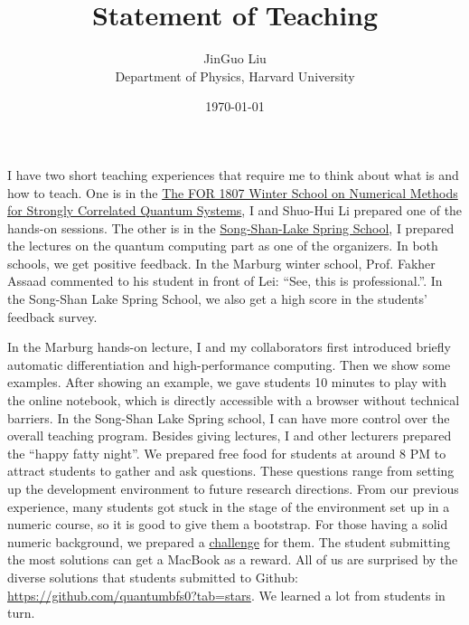 \documentclass[a4paper]{article}
\title{Statement of Teaching}
\author{JinGuo Liu\\ Department of Physics, Harvard University}
\date{\today}
\newcommand{\<}{\langle}
\renewcommand{\>}{\rangle}
\begin{document}
\fontsize{10}{13}
\selectfont
\maketitle

I have two short teaching experiences that require me to think about what is and how to teach.
One is in the \href{https://for1807.physik.uni-wuerzburg.de/2017/07/11/winter-school-2018/}{The FOR 1807 Winter School on Numerical Methods for Strongly Correlated Quantum Systems}, I and Shuo-Hui Li prepared one of the hands-on sessions.
The other is in the \href{https://github.com/QuantumBFS/SSSS}{Song-Shan-Lake Spring School}, I prepared the lectures on the quantum computing part as one of the organizers.
In both schools, we get positive feedback. In the Marburg winter school, Prof. Fakher Assaad commented to his student in front of Lei: ``See, this is professional.''.
In the Song-Shan Lake Spring School, we also get a high score in the students' feedback survey.

In the Marburg hands-on lecture, I and my collaborators first introduced briefly automatic differentiation and high-performance computing.
Then we show some examples. After showing an example, we gave students 10 minutes to play with the online notebook, which is directly accessible with a browser without technical barriers.
In the Song-Shan Lake Spring school, I can have more control over the overall teaching program.
Besides giving lectures, I and other lecturers prepared the ``happy fatty night''.
We prepared free food for students at around 8 PM to attract students to gather and ask questions.
These questions range from setting up the development environment to future research directions.
From our previous experience, many students got stuck in the stage of the environment set up in a numeric course, so it is good to give them a bootstrap.
For those having a solid numeric background, we prepared a \href{https://github.com/QuantumBFS/SSSS/blob/master/Challenge.md}{challenge} for them.
The student submitting the most solutions can get a MacBook as a reward.
All of us are surprised by the diverse solutions that students submitted to Github: \href{https://github.com/quantumbfs0?tab=stars}{https://github.com/quantumbfs0?tab=stars}.
We learned a lot from students in turn.
\end{document}
